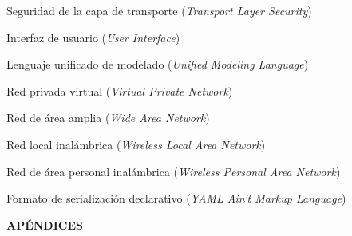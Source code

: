 \documentclass[a4paper, 12pt]{article}
\begin{document}
\begin{description}[leftmargin=2cm, labelwidth=1.8cm, labelsep=0.2cm, align=parleft, font=\bfseries, itemsep=2pt, parsep=0pt, topsep=6pt]
    \item[TLS] Seguridad de la capa de transporte (\textit{Transport Layer Security})
    \item[UI] Interfaz de usuario (\textit{User Interface})
    \item[UML] Lenguaje unificado de modelado (\textit{Unified Modeling Language})
    \item[VPN] Red privada virtual (\textit{Virtual Private Network})
    \item[WAN] Red de área amplia (\textit{Wide Area Network})
    \item[WLAN] Red local inalámbrica (\textit{Wireless Local Area Network})
    \item[WPAN] Red de área personal inalámbrica (\textit{Wireless Personal Area Network})
    \item[YAML] Formato de serialización declarativo (\textit{YAML Ain't Markup Language})
\end{description}


\newpage
\newpage

\pagestyle{cuerpo}
\thispagestyle{cuerpo}



















\newpage
 



\appendix
\clearpage
\addappheadtotoc
\vspace*{\fill}
\begin{center}
    \Huge \textbf{APÉNDICES}
\end{center}
\vspace*{\fill}
\clearpage


\end{document}
